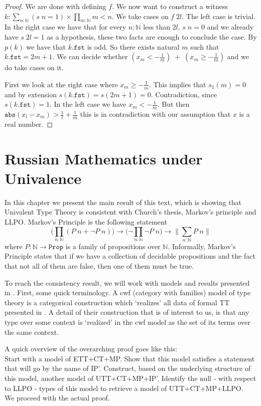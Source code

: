 \documentclass[12pt]{report}
\theoremstyle{definition}
\begin{document}
\begin{proof}
We are done with defining $f$. 
We now want to construct a witness $k : \sum_{n : \mathbb{N}}(s\;n = 1)\times \prod_{m : \mathbb{N}}m < n$. 
We take cases on $f\; 2l$. 
The left case is trivial. 
In the right case we have that for every $n :\mathbb{N}$ less than $2l$, $s\;n = 0$ and we already have $s\;2l = 1$ as a hypothesis, these two facts are enough to conclude the case. 
By $p(k)$ we have that $k.\mathtt{fst}$ is odd. 
So there exists natural $m$ such that $k.\mathtt{fst} = 2m+1$. 
We can decide whether $(x_m < -\frac{1}{m})\;+\;(x_m \geq -\frac{1}{m})$ and we do take cases on it. 

First we look at the right case where $x_m \geq -\frac{1}{m}$. 
This implies that $s_1(m) = 0$ and by extension $s(k.\mathtt{fst}) = s(2m+1) = 0$. 
Contradiction, since $s(k.\mathtt{fst}) = 1$. 
In the left case we have $x_m < -\frac{1}{m}$. 
But then $\mathtt{abs}(x_l-x_m) > \frac{1}{l} + \frac{1}{m}$ this is in contradiction with our assumption that $x$ is a real number. 
\end{proof}

\chapter{Russian Mathematics under Univalence}
In this chapter we present the main result of this text, which is showing that Univalent Type Theory is consistent with Church's thesis, Markov's principle and LLPO. 
Markov's Principle is the following statement
$$\Big(\prod_{n : \mathbb{N}}(P\; n + \neg P\; n)\Big) \rightarrow  \Big(\neg \prod_{n : \mathbb{N}}\neg P\; n\Big)\rightarrow \Big\lVert \sum_{n : \mathbb{N}} P\; n \Big\rVert$$
where $P : \mathbb{N} \rightarrow \mathtt{Prop}$ is a family of propositions over $\mathbb{N}$. 
Informally, Markov's Principle states that if we have a collection of decidable propositions and the fact that not all of them are false, then one of them must be true. 

To reach the consistency result, we will work with models and results presented in \cite{1905.03014}. 
First, some quick terminology. 
A cwf (category with families) model of type theory is a categorical construction which `realizes' all data of formal TT presented in . 
A detail of their construction that is of interest to us, is that any type over some context is `realized' in the cwf model as the set of its terms over the same context. 

A quick overview of the overarching proof goes like this:\\
Start with a model of ETT+CT+MP. 
Show that this model satisfies a statement that will go by the name of IP'. 
Construct, based on the underlying structure of this model, another model of UTT+CT+MP+IP'. 
Identify the null - with respect to LLPO - types of this model to retrieve a model of UTT+CT+MP+LLPO.\\
We proceed with the actual proof. 
\end{document}
